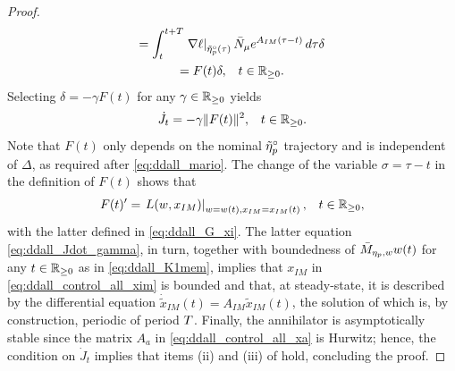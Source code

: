 \begin{proof}
\begin{multline}
	            = \int_{t}^{t+T} \left.\nabla \ell\right|_{\tilde{\eta}_p^{\circ}(\tau)}\bar{N}_\mu e^{A_{IM}(\tau-t)}\,d\tau\delta\\
              \begin{aligned}= F(t) \delta, && t\in\mathbb{R}_{\geq 0}.\end{aligned}
  \end{multline}
  Selecting $\delta = -\gamma F(t)$ for any $\gamma\in\mathbb{R}_{\geq 0}$ yields
  \begin{align}
    \label{eq:ddall_Jdot_gamma}
    \dot{J}_t &= -\gamma\|F(t)\|^2, & t\in\mathbb{R}_{\geq 0}.
  \end{align}
  Note that $F(t)$ only depends on the nominal $\tilde{\eta}_p^{\circ}$ trajectory and is independent of $\Delta$, as required after \eqref{eq:ddall_mario}.
	The change of the variable $\sigma = \tau - t$ in the definition of $F(t)$ shows that
  \begin{align}
    F(t)' &= \left.L(w,x_{IM})\right|_{w=w(t),x_{IM}=x_{IM}(t)}, & t\in\mathbb{R}_{\geq 0},
  \end{align}
  with the latter defined in \eqref{eq:ddall_G_xi}.
	The latter equation	\eqref{eq:ddall_Jdot_gamma}, in turn, together with boundedness of $\bar{M}_{\eta_p,w}w(t)$ for any $t\in\mathbb{R}_{\geq 0}$ as in \eqref{eq:ddall_K1mem}, implies that $x_{IM}$ in \eqref{eq:ddall_control_all_xim} is bounded and that, at steady-state, it is described by the differential equation $\dot{\tilde{x}}_{IM}(t) = A_{IM}\tilde{x}_{IM}(t)$, the solution of which is, by construction, periodic of period $T$.
  Finally, the annihilator is asymptotically stable since the matrix $A_a$ in \eqref{eq:ddall_control_all_xa} is Hurwitz; hence, the condition on $\dot{J}_{t}$ implies	that items (ii) and (iii) of  hold, concluding the proof.
\end{proof}

